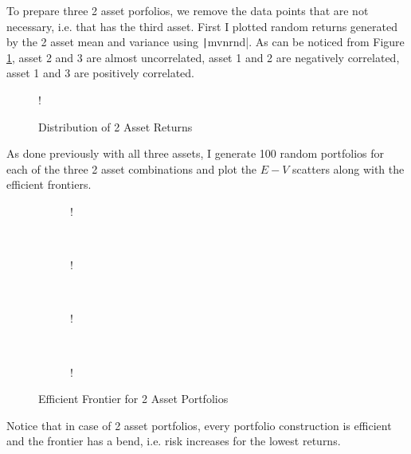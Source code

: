 \documentclass[11pt]{article}
\begin{document}
To prepare three 2 asset porfolios, we remove the data points that are not necessary, i.e. that has
the third asset. First I plotted random returns generated by the 2 asset mean and variance using
\texttt|mvnrnd|. As can be noticed from Figure \ref{fig:q1-b-return-distribution}, asset
2 and 3 are almost uncorrelated, asset 1 and 2 are negatively correlated, asset 1 and 3 are positively
correlated.\\

\begin{figure}[!h]
	\centering 
	 {!} { }
	\caption{Distribution of 2 Asset Returns}
	\label{fig:q1-b-return-distribution}
\end{figure}

As done previously with all three assets, I generate 100 random portfolios for each of the three 2 asset
combinations and plot the $E-V$ scatters along with the efficient frontiers.\\

\begin{figure}[!h]
   \centering 
   \begin{subfigure}[b]{0.23\textwidth}
     	\resizebox {\textwidth} {!} { }
		\label{fig:q1-b-efficient-frontier-1}
    \end{subfigure}
    ~
    \begin{subfigure}[b]{0.23\textwidth}
       	\resizebox {\textwidth} {!} { }
        \label{fig:q1-b-efficient-frontier-2}
    \end{subfigure}
	~
    \begin{subfigure}[b]{0.23\textwidth}
       	\resizebox {\textwidth} {!} { }
        \label{fig:q1-b-efficient-frontier-3}
    \end{subfigure}
	~
    \begin{subfigure}[b]{0.23\textwidth}
       	\resizebox {\textwidth} {!} { }
        \label{fig:q1-b-efficient-frontier-all}
    \end{subfigure}
	\vspace{-0.5cm}
    \caption{Efficient Frontier for 2 Asset Portfolios}\label{fig:naive_v_cvx}
\end{figure}

Notice that in case of 2 asset portfolios, every portfolio construction is efficient and the frontier
has a bend, i.e. risk increases for the lowest returns.\\
\end{document}

